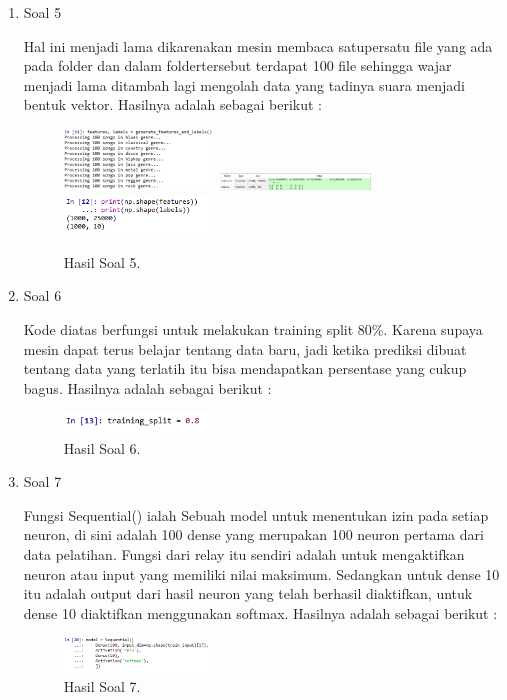 \begin{enumerate}
	\item Soal 5
	\hfill\break
	
	Hal ini menjadi lama dikarenakan mesin membaca satupersatu file yang ada pada folder dan dalam foldertersebut terdapat 100 file sehingga wajar menjadi lama ditambah lagi mengolah data yang tadinya suara menjadi bentuk vektor. Hasilnya adalah sebagai berikut :
	\begin{figure}[H]
	\centering
		\includegraphics[width=4cm]{figures/1174077/6/12.png}
		\includegraphics[width=4cm]{figures/1174077/6/13.png}
		\includegraphics[width=4cm]{figures/1174077/6/14.png}
		\caption{Hasil Soal 5.}
	\end{figure}

	\item Soal 6
	\hfill\break
	
	Kode diatas berfungsi untuk melakukan training split 80\%. Karena supaya mesin dapat terus belajar tentang data baru, jadi ketika prediksi dibuat tentang data yang terlatih itu bisa mendapatkan persentase yang cukup bagus. Hasilnya adalah sebagai berikut :
	\begin{figure}[H]
	\centering
		\includegraphics[width=4cm]{figures/1174077/6/15.png}
		\caption{Hasil Soal 6.}
	\end{figure}

	\item Soal 7
	\hfill\break
	
	Fungsi Sequential() ialah Sebuah model untuk menentukan izin pada setiap neuron, di sini adalah 100 dense yang merupakan 100 neuron pertama dari data pelatihan. Fungsi dari relay itu sendiri adalah untuk mengaktifkan neuron atau input yang memiliki nilai maksimum. Sedangkan untuk dense 10 itu adalah output dari hasil neuron yang telah berhasil diaktifkan, untuk dense 10 diaktifkan menggunakan softmax. Hasilnya adalah sebagai berikut :
	\begin{figure}[H]
	\centering
		\includegraphics[width=4cm]{figures/1174077/6/16.png}
		\caption{Hasil Soal 7.}
	\end{figure}


\end{enumerate}
